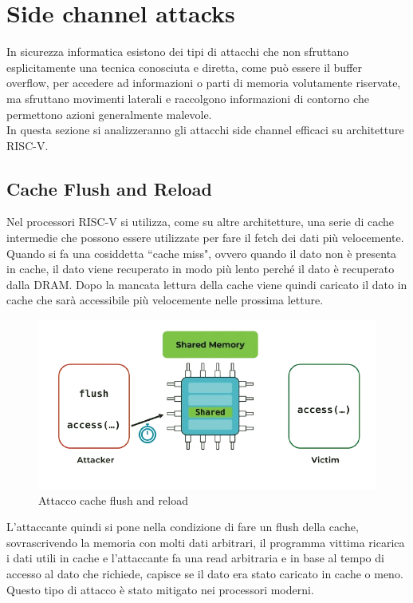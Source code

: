 \section*{Side channel attacks}
In sicurezza informatica esistono dei tipi di attacchi che non sfruttano esplicitamente una tecnica conosciuta e diretta, come può essere il buffer overflow, per accedere ad informazioni o parti di memoria volutamente riservate, ma sfruttano movimenti laterali e raccolgono informazioni di contorno che permettono azioni generalmente malevole.\\
In questa sezione si analizzeranno gli attacchi side channel efficaci su architetture RISC-V.
\newline
\subsection*{Cache Flush and Reload}
Nel processori RISC-V si utilizza, come su altre architetture, una serie di cache intermedie che possono essere utilizzate per fare il fetch dei dati più velocemente. Quando si fa una cosiddetta ``cache miss", ovvero quando il dato non è presenta in cache, il dato viene recuperato in modo più lento perché il dato è recuperato dalla DRAM. Dopo la mancata lettura della cache viene quindi caricato il dato in cache che sarà accessibile più velocemente nelle prossima letture.
\FloatBarrier
\vspace{1cm}
\begin{figure}[!htbp]
    \centering
    \includegraphics[width=1\linewidth]{images/shared-memory.png}
    \caption{Attacco cache flush and reload}
\end{figure}
\vspace{1cm}
\FloatBarrier
L'attaccante quindi si pone nella condizione di fare un flush della cache, sovrascrivendo la memoria con molti dati arbitrari, il programma vittima ricarica i dati utili in cache e l'attaccante fa una read arbitraria e in base al tempo di accesso al dato che richiede, capisce se il dato era stato caricato in cache o meno.\\
Questo tipo di attacco è stato mitigato nei processori moderni.
